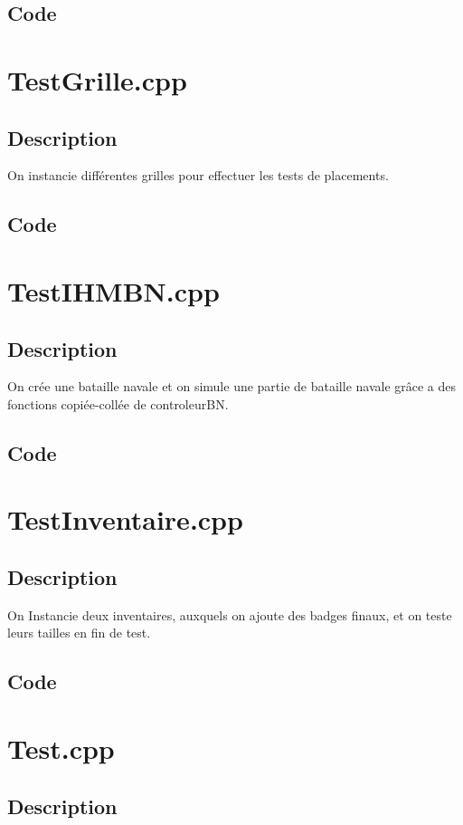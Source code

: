         \subsection{Code}
    \section{TestGrille.cpp}
        \subsection{Description}
            On instancie différentes grilles pour effectuer les tests de placements.
        \subsection{Code}
    \section{TestIHMBN.cpp}
        \subsection{Description}
            On crée une bataille navale et on simule une partie de bataille navale grâce a des fonctions copiée-collée de controleurBN.
        \subsection{Code}
    \section{TestInventaire.cpp}
        \subsection{Description}
            On Instancie deux inventaires, auxquels on ajoute des badges finaux, et on teste leurs tailles en fin de test.
        \subsection{Code}
    \section{Test.cpp}
        \subsection{Description}
